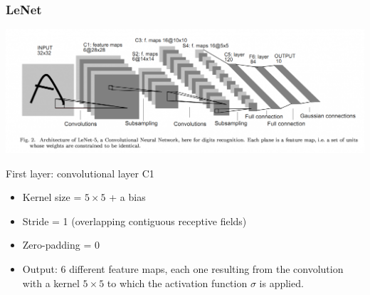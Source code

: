 \begin{frame}
	\frametitle{LeNet}



\begin{center}
	\includegraphics[scale=0.3]{figs/LeNet}
\end{center}

 
First layer: convolutional layer C1
\begin{itemize}
	\item Kernel size = $5 \times 5$ + a bias
	\item Stride = 1 (overlapping contiguous receptive fields)
	\item Zero-padding = 0
	\item Output: 6 different feature maps, each one resulting from the convolution with a kernel $5\times 5$ to which the activation function $\sigma$ is applied. 
\end{itemize}
\end{frame}


